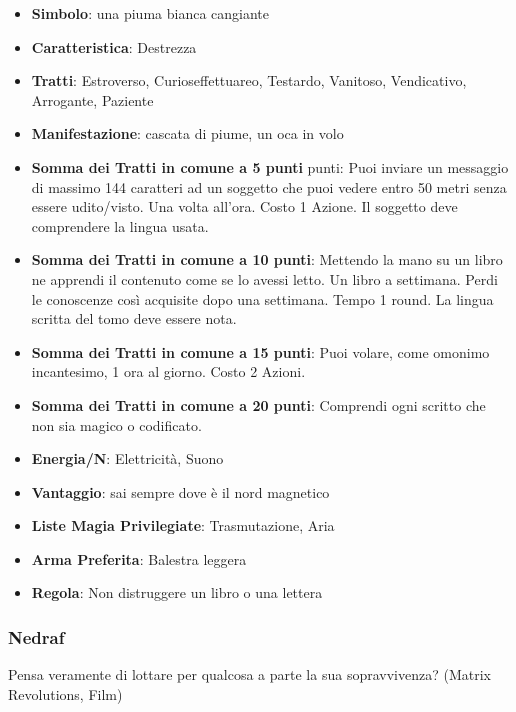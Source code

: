 \begin{multicols}{2}
\begin{itemize}[leftmargin=*] \setlength{\itemsep}{0pt}
\item \textbf{Simbolo}: una piuma bianca cangiante
\item \textbf{Caratteristica}: Destrezza
\item \textbf{Tratti}: Estroverso, Curioseffettuareo, Testardo, Vanitoso, Vendicativo, Arrogante, Paziente
\item \textbf{Manifestazione}: cascata di piume, un oca in volo
\item \textbf{Somma dei Tratti in comune a 5 punti} punti: Puoi inviare un messaggio di massimo 144 caratteri ad un soggetto che puoi vedere entro 50 metri senza essere udito/visto. Una volta all'ora. Costo 1 Azione. Il soggetto deve comprendere la lingua usata.
\item \textbf{Somma dei Tratti in comune a 10 punti}: Mettendo la mano su un libro ne apprendi il contenuto come se lo avessi letto. Un libro a settimana. Perdi le conoscenze così acquisite dopo una settimana. Tempo 1 round. La lingua scritta del tomo deve essere nota.
\item \textbf{Somma dei Tratti in comune a 15 punti}: Puoi volare, come omonimo incantesimo, 1 ora al giorno. Costo 2 Azioni.
\item \textbf{Somma dei Tratti in comune a 20 punti}: Comprendi ogni scritto che non sia magico o codificato.
\item \textbf{Energia/N}: Elettricità, Suono
\item \textbf{Vantaggio}: sai sempre dove è il nord magnetico
\item \textbf{Liste Magia Privilegiate}: Trasmutazione, Aria
\item \textbf{Arma Preferita}: Balestra leggera
\item \textbf{Regola}: Non distruggere un libro o una lettera
\end{itemize}

\subsubsection{Nedraf}\label{nedraf}\hypertarget{nedraf}{}


\begin{changemargin}{0.3cm}{0.3cm}\begin{enfasi}{
Pensa veramente di lottare per qualcosa a parte la sua sopravvivenza? (Matrix Revolutions, Film)

\medskip

}
\end{enfasi}
\end{changemargin}
\end{multicols}
